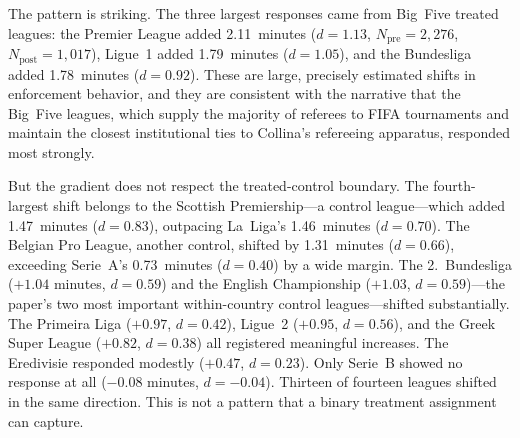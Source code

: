 

The pattern is striking.
The three largest responses came from Big~Five treated leagues: the
Premier League added 2.11~minutes ($d = 1.13$, $N_{\text{pre}} = 2{,}276$,
$N_{\text{post}} = 1{,}017$), Ligue~1 added 1.79~minutes ($d = 1.05$),
and the Bundesliga added 1.78~minutes ($d = 0.92$). These are large,
precisely estimated shifts in enforcement behavior, and they are
consistent with the narrative that the Big~Five leagues, which supply
the majority of referees to FIFA tournaments and maintain the closest
institutional ties to Collina's refereeing apparatus, responded most
strongly.

But the gradient does not respect the treated-control boundary. The
fourth-largest shift belongs to the Scottish Premiership---a control
league---which added 1.47~minutes ($d = 0.83$), outpacing La~Liga's
1.46~minutes ($d = 0.70$). The Belgian Pro League, another control,
shifted by 1.31~minutes ($d = 0.66$), exceeding Serie~A's 0.73~minutes
($d = 0.40$) by a wide margin. The 2.~Bundesliga ($+1.04$ minutes,
$d = 0.59$) and the English Championship ($+1.03$, $d = 0.59$)---the
paper's two most important within-country control leagues---shifted
substantially. The Primeira Liga ($+0.97$, $d = 0.42$), Ligue~2
($+0.95$, $d = 0.56$), and the Greek Super League ($+0.82$, $d = 0.38$)
all registered meaningful increases. The Eredivisie responded modestly
($+0.47$, $d = 0.23$). Only Serie~B showed no response at all
($-0.08$ minutes, $d = -0.04$). Thirteen of fourteen leagues shifted
in the same direction. This is not a pattern that a binary treatment
assignment can capture.

